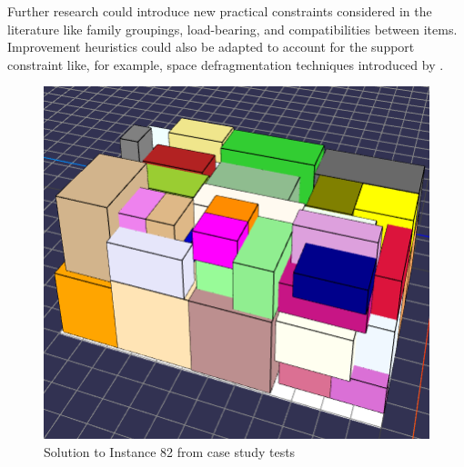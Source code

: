 \documentclass[11pt,a4paper,twocolumn]{article}
\begin{document}
Further research could introduce new practical constraints considered in the literature like family groupings, load-bearing, and compatibilities between items.
Improvement heuristics could also be adapted to account for the support constraint like, for example, space defragmentation techniques introduced by \cite{ZHU2012452}.




\begin{figure}
    \centering
    \includegraphics[width = \columnwidth]{tests/usecase/instance-82_k200.PNG}
    \caption{Solution to Instance 82 from case study tests}
\end{figure}
\end{document}
